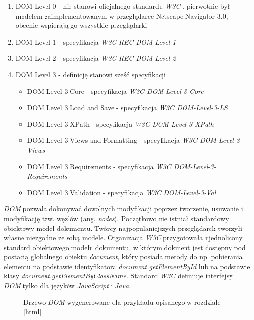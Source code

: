 \documentclass[polish, twoside, 12pt]{mwart}
\begin{document}
\begin{enumerate}
  \item DOM Level 0 - nie stanowi oficjalnego standardu \emph{W3C} \cite{w3c}, pierwotnie był modelem zaimplementowanym w przeglądarce Netscape Navigator 3.0, obecnie wspierają go wszystkie przeglądarki
  \item DOM Level 1 - specyfikacja \emph{W3C REC-DOM-Level-1} \cite{w3c-rec-dom-level-1} 
  \item DOM Level 2 - specyfikacja \emph{W3C REC-DOM-Level-2} \cite{w3c-rec-dom-level-2} 
  \item DOM Level 3 - definicję stanowi sześć specyfikacji
  \begin{itemize}
    \item DOM Level 3 Core - specyfikacja \emph{W3C DOM-Level-3-Core} \cite{w3c-rec-dom-level-3-core}
    \item DOM Level 3 Load and Save - specyfikacja \emph{W3C DOM-Level-3-LS} \cite{w3c-rec-dom-level-3-ls}
    \item DOM Level 3 XPath - specyfikacja \emph{W3C DOM-Level-3-XPath} \cite{w3c-rec-dom-level-3-xpath}
    \item DOM Level 3 Views and Formatting - specyfikacja \emph{W3C DOM-Level-3-Views} \cite{w3c-rec-dom-level-3-views}
    \item DOM Level 3 Requirements - specyfikacja \emph{W3C DOM-Level-3-Requirements} \cite{w3c-rec-dom-level-3-requirements}
    \item DOM Level 3 Validation - specyfikacja \emph{W3C DOM-Level-3-Val} \cite{w3c-rec-dom-level-3-val}
  \end{itemize}
\end{enumerate}

\emph{DOM} pozwala dokonywać dowolnych modyfikacji poprzez tworzenie, usuwanie i modyfikację tzw. węzłów (ang. \emph{nodes}). Początkowo nie istniał standardowy obiektowy model dokumentu. Twórcy najpopulaniejszych przeglądarek tworzyłi własne niezgodne ze sobą modele. Organizacja \emph{W3C} \cite{w3c} przygotowała ujednolicony standard obiektowego modelu dokumentu, w którym dokment jest dostępny pod postacią globalnego obiektu \emph{document}, który posiada metody do np. pobierania elementu na podstawie identyfikatora \emph{document.getElementById} lub na podstawie klasy \emph{document.getElementByClassName}. Standard \emph{W3C} definiuje interfejsy \emph{DOM} tylko dla języków \emph{JavaScript} i \emph{Java}.

\begin{figure}
  \centering
  \caption{Drzewo \emph{DOM} wygenerowane dla przykładu opisanego w rozdziale \ref{html}}
\end{figure}
\end{document}
